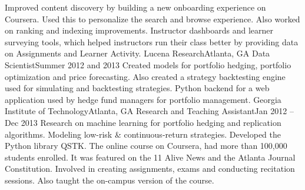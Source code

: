{        
          {Improved content discovery by building a new onboarding experience on Coursera. Used this to personalize the search and browse experience. Also worked on ranking and indexing improvements.}
          {Instructor dashboards and learner surveying tools, which helped instructors run their class better by providing data on Assignments and Learner Activity.}
      \resumeItemListEnd
    \resumeSubheading
      {Lucena Research}{Atlanta, GA}
      {Data Scientist}{Summer 2012 and 2013}
      \resumeItemListStart
          {Created models for portfolio hedging, portfolio optimization and price forecasting. Also created a strategy backtesting engine used for simulating and backtesting strategies.}
          {Python backend for a web application used by hedge fund managers for portfolio management.}
      \resumeItemListEnd
    \resumeSubheading
      {Georgia Institute of Technology}{Atlanta, GA}
      {Research and Teaching Assistant}{Jan 2012 -- Dec 2013}
      \resumeItemListStart
          {Research on machine learning for portfolio hedging and replication algorithms. Modeling low-risk \& continuous-return strategies. Developed the Python library QSTK.}
          {The online course on Coursera, had more than 100,000 students enrolled. It was featured on the 11 Alive News and the Atlanta Journal Constitution. Involved in creating assignments, exams and conducting recitation sessions. Also taught the on-campus version of the course.}
      \resumeItemListEnd
  \resumeSubHeadingListEnd
}

\newcommand{\projectsSection}{%
  \section{Projects}
  \resumeSubHeadingListStart
    \resumeSubItem{QuantSoftware Toolkit}
      {Open source Python library for financial data analysis and machine learning for finance.}
    \resumeSubItem{GitHub Visualization}
      {Data visualization of Git log data using D3 to analyze project trends over time.}
    \resumeSubItem{Recommendation System}
      {Music and movie recommender systems using collaborative filtering on public datasets.}
    \resumeSubItem{Mac Setup}
      {Book that gives step-by-step instructions on setting up developer environment on macOS.}
  \resumeSubHeadingListEnd
}

